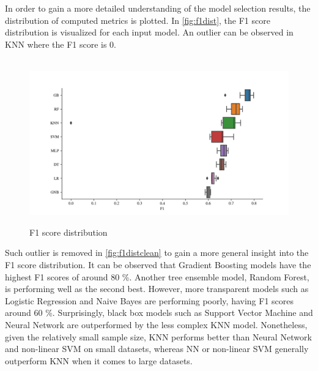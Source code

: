 \begin{table}[H]
    \vspace{-1em}
\end{table}

\clearpage
\newpage
{}
\restoregeometry
\fancyheadoffset{0pt}

In order to gain a more detailed understanding of the model selection results, the distribution of computed metrics is plotted. In \autoref{fig:f1dist}, the F1 score distribution is visualized for each input model. An outlier can be observed in KNN where the F1 score is 0.				
\begin{figure}[H]
    \centering
    \caption{F1 score distribution}\vspace{0.5em}
    \label{fig:f1dist}\
    \includegraphics[width=140mm]{Figures/F1_Distribution.jpg}
    \vspace{-1em}
\end{figure}
Such outlier is removed in \autoref{fig:f1distclean} to gain a more general insight into the F1 score distribution.
It can be observed that Gradient Boosting models have the highest F1 scores of around 80 \%.
Another tree ensemble model, Random Forest, is performing well as the second best. However, more transparent models such as Logistic Regression and Naive Bayes are performing poorly, having F1 scores around 60 \%.
Surprisingly, black box models such as Support Vector Machine and Neural Network are outperformed by the less complex KNN model.
Nonetheless, given the relatively small sample size, KNN performs better than Neural Network and non-linear SVM on small datasets, whereas NN or non-linear SVM generally outperform KNN when it comes to large datasets.
